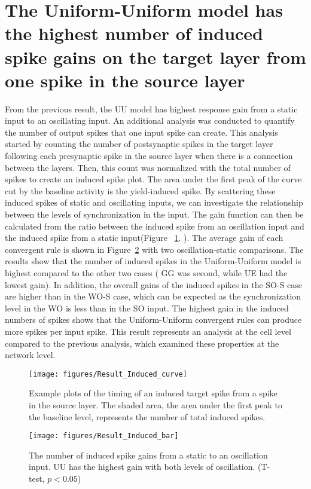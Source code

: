 \section{The Uniform-Uniform model has the highest number of induced spike gains on the target layer from one spike in the source layer}
 From the previous result, the UU model  has highest response gain from a static input to an oscillating input. An additional analysis was conducted to quantify the number of output spikes that one input spike can create. This analysis started by counting the number of postsynaptic spikes in the target layer following each presynaptic spike in the source layer when there is a connection between the layers. Then, this count was normalized with the total number of spikes to create an induced spike plot. The area under the first peak of the curve cut by the baseline activity is the yield-induced spike.  By scattering these induced spikes of static and oscillating inputs, we can investigate the relationship between the levels of synchronization in the input. The gain function can then be calculated from the ratio between the induced spike from an oscillation input and the induced spike from a static input(Figure ~\ref{fig:InduceCurve}. ). The average gain of each convergent rule is shown in Figure~\ref{fig:InduceBar}  with two oscillation-static comparisons. The results show that the number  of induced spikes in the Uniform-Uniform model is highest compared to the other two cases ( GG was second, while UE had the lowest gain). In addition, the overall gains of the induced spikes in the SO-S case are higher than in the WO-S case, which can be expected as the synchronization level in the WO is less than in the SO input. The highest gain in the induced numbers of spikes shows that the Uniform-Uniform convergent rules can produce more spikes per input spike. This result represents an analysis at the cell level compared to the previous analysis, which examined these properties at the network level. 



\begin{figure}[!h]
	\centering
	\texttt{[image: figures/Result\_Induced\_curve]}
	\caption{Example plots of the timing of an induced target spike from a spike in the source layer. The shaded area, the area under the first peak  to the baseline level, represents the number of total induced spikes.}
	\label{fig:InduceCurve}
\end{figure}

\begin{figure}[!h]
	\centering
	\texttt{[image: figures/Result\_Induced\_bar]}
	\caption{The number of induced spike gains from a static to an oscillation input. UU has the highest gain with both levels of oscillation. (T-test, $p < 0.05$)} %
	\label{fig:InduceBar}
\end{figure}

